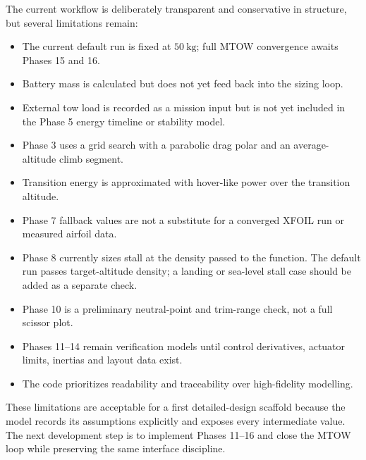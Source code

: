 The current workflow is deliberately transparent and conservative in structure, but several limitations remain:
\begin{itemize}[leftmargin=*]
    \item The current default run is fixed at \(50~\mathrm{kg}\); full MTOW convergence awaits Phases 15 and 16.
    \item Battery mass is calculated but does not yet feed back into the sizing loop.
    \item External tow load is recorded as a mission input but is not yet included in the Phase 5 energy timeline or stability model.
    \item Phase 3 uses a grid search with a parabolic drag polar and an average-altitude climb segment.
    \item Transition energy is approximated with hover-like power over the transition altitude.
    \item Phase 7 fallback values are not a substitute for a converged XFOIL run or measured airfoil data.
    \item Phase 8 currently sizes stall at the density passed to the function. The default run passes target-altitude density; a landing or sea-level stall case should be added as a separate check.
    \item Phase 10 is a preliminary neutral-point and trim-range check, not a full scissor plot.
    \item Phases 11--14 remain verification models until control derivatives, actuator limits, inertias and layout data exist.
    \item The code prioritizes readability and traceability over high-fidelity modelling.
\end{itemize}

These limitations are acceptable for a first detailed-design scaffold because the model records its assumptions explicitly and exposes every intermediate value. The next development step is to implement Phases 11--16 and close the MTOW loop while preserving the same interface discipline.
